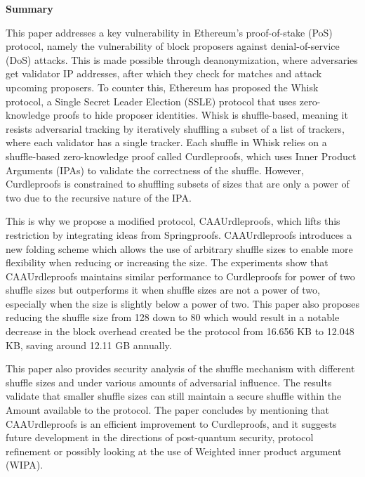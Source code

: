 \onecolumn     %
\thispagestyle{empty}

\begin{center}
    \begin{tcolorbox}[
        width=\dimexpr\paperwidth - 2in\relax,  %
        colback=white,                          %
        colframe=white,                         %
        left=60pt, right=60pt, top=10pt, bottom=10pt, %
        boxrule=0.8pt, %
        fontupper=\large
    ]
        \textbf{\large Summary}%

This paper addresses a key vulnerability in Ethereum’s proof-of-stake (PoS) protocol, namely the vulnerability of block proposers against denial-of-service (DoS) attacks.
This is made possible through deanonymization, where adversaries get validator IP addresses, after which they check for matches and attack upcoming proposers.
To counter this, Ethereum has proposed the Whisk protocol, a Single Secret Leader Election (SSLE) protocol that uses zero-knowledge proofs to hide proposer identities.
Whisk is shuffle-based, meaning it resists adversarial tracking by iteratively shuffling a subset of a list of trackers, where each validator has a single tracker.
Each shuffle in Whisk relies on a shuffle-based zero-knowledge proof called Curdleproofs, which uses Inner Product Arguments (IPAs) to validate the correctness of the shuffle.
However, Curdleproofs is constrained to shuffling subsets of sizes that are only a power of two due to the recursive nature of the IPA.


This is why we propose a modified protocol, CAAUrdleproofs, which lifts this restriction by integrating ideas from Springproofs.
CAAUrdleproofs introduces a new folding scheme which allows the use of arbitrary shuffle sizes to enable more flexibility when reducing or increasing the size.
The experiments show that CAAUrdleproofs maintains similar performance to Curdleproofs for power of two shuffle sizes but outperforms it when shuffle sizes are not a power of two, especially when the size is slightly below a power of two.
This paper also proposes reducing the shuffle size from 128 down to 80 which would result in a notable decrease in the block overhead created be the protocol from 16.656 KB to 12.048 KB, saving around 12.11 GB annually.


This paper also provides security analysis of the shuffle mechanism with different shuffle sizes and under various amounts of adversarial influence.
The results validate that smaller shuffle sizes can still maintain a secure shuffle within the Amount available to the protocol.
The paper concludes by mentioning that CAAUrdleproofs is an efficient improvement to Curdleproofs, and it suggests future development in the directions of post-quantum security, protocol refinement or possibly looking at the use of Weighted inner product argument (WIPA).



        \end{tcolorbox}
    \end{center}